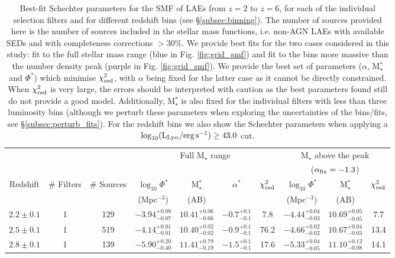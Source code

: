 \documentclass[a4paper,fleqn,usenatbib]{mnras}
\begin{document}
\begin{table*}
\setlength{\tabcolsep}{5pt}
\caption{Best-fit Schechter parameters for the SMF of LAEs from $z=2$ to $z=6$, for each of the individual selection filters and for different redshift bins (see \S\ref{subsec:binning}). The number of sources provided here is the number of sources included in the stellar mass functions, i.e. non-AGN LAEs with available SEDs and with completeness corrections $>30\%$. We provide best fits for the two cases considered in this study: fit to the full stellar mass range (blue in Fig. \ref{fig:grid_smf}) and fit to the bins more massive than the number density peak (purple in Fig. \ref{fig:grid_smf}). We provide the best set of parameters ($\alpha$, M$_\star^*$ and $\Phi^*$) which minimise $\chi^2_{\rm red}$, with $\alpha$ being fixed for the latter case as it cannot be directly constrained. When $\chi^2_{\rm red}$ is very large, the errors should be interpreted with caution as the best parameters found still do not provide a good model. Additionally, M$_\star^*$ is also fixed for the individual filters with less than three luminosity bins (although we perturb these parameters when exploring the uncertainties of the bins/fits, see \S\ref{subsec:perturb_fits}). For the redshift bins we also show the Schechter parameters when applying a $\log_{10} (\rm L_{Ly\alpha}/erg\,s^{-1}) \geq 43.0$ cut.} \label{tab:schechter_params_smf}
\begin{tabular}{ccc | cccc | ccc}
\hline
  & & & \multicolumn{4}{c}{Full M$_\star$ range}  |& \multicolumn{3}{c}{M$_\star$ above the peak}\\ 
   & & & \multicolumn{4}{c}{}  & \multicolumn{3}{c}{($\alpha_{\rm fix}=-1.3$)}\\
\hline
Redshift & \# Filters & \# Sources & $\log_{10}\Phi^*$ & M$_\star^*$ & $\alpha^*$ & $\chi^2_{\rm red}$ & $\log_{10}\Phi^*$ & M$_\star^*$ & $\chi^2_{\rm red}$\\
&  &  & (Mpc$^{-3}$) & (AB) & & &(Mpc$^{-3}$)&(AB)& \\
\hline
$2.2\pm0.1$ & 1 & 129 & $-3.94^{+0.08}_{-0.07}$ & $10.41^{+0.06}_{-0.06}$ & $-0.7^{+0.1}_{-0.1}$ & 7.8 & $-4.44^{+0.04}_{-0.03}$ & $10.69^{+0.05}_{-0.05}$ & 7.7 \\
$2.5\pm0.1$ & 1 & 519 & $-4.14^{+0.01}_{-0.01}$ & $10.40^{+0.02}_{-0.02}$ & $-0.9^{+0.1}_{-0.1}$ & 76.2 & $-4.66^{+0.02}_{-0.02}$ & $10.67^{+0.04}_{-0.03}$ & 13.4 \\
$2.8\pm0.1$ & 1 & 139 & $-5.90^{+0.20}_{-0.40}$ & $11.41^{+0.79}_{-0.19}$ & $-1.5^{+0.1}_{-0.1}$ & 17.6 & $-5.33^{+0.04}_{-0.05}$ & $11.10^{+0.12}_{-0.08}$ & 14.1 \\

\end{tabular}
\end{table*}
\end{document}

